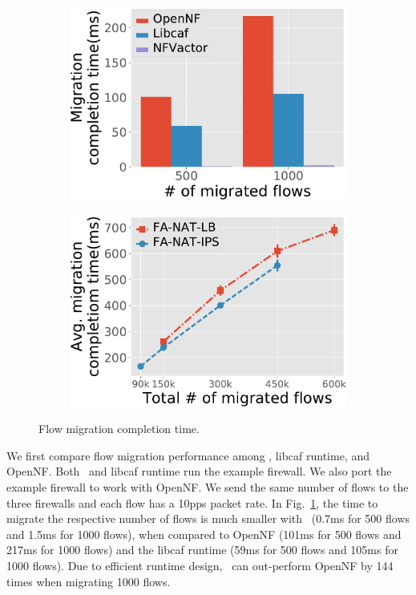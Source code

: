 \begin{figure}[!h]
 \begin{subfigure}[t]{0.49\linewidth}
   \centering
   \includegraphics[width=\columnwidth]{chap-nfvactor/exp-figure/migration_compare.pdf}
   \caption{}\label{fig:migration_compare} \end{subfigure}\hfill
  \begin{subfigure}[t]{0.49\linewidth}
   \centering
   \includegraphics[width=\columnwidth]{chap-nfvactor/exp-figure/migration_time.pdf}
   \caption{}\label{fig:migration_time}
  \end{subfigure}
\caption{Flow migration completion time.}
\label{fig:mig-perf}
\end{figure}

We first compare flow migration performance among \nfactor, libcaf runtime, and OpenNF. Both \nfactor~and libcaf runtime run the example firewall. We also port the example firewall to work with OpenNF. We send the same number of flows to the three firewalls and each flow has a 10pps packet rate. In Fig.~\ref{fig:migration_compare}, the time to migrate the respective number of flows is much smaller with \nfactor~(0.7ms for 500 flows and 1.5ms for 1000 flows), when compared to OpenNF (101ms for 500 flows and 217ms for 1000 flows) and the libcaf runtime (59ms for 500 flows and 105ms for 1000 flows). Due to efficient runtime design, \nfactor~can out-perform OpenNF by 144 times when migrating 1000 flows.

